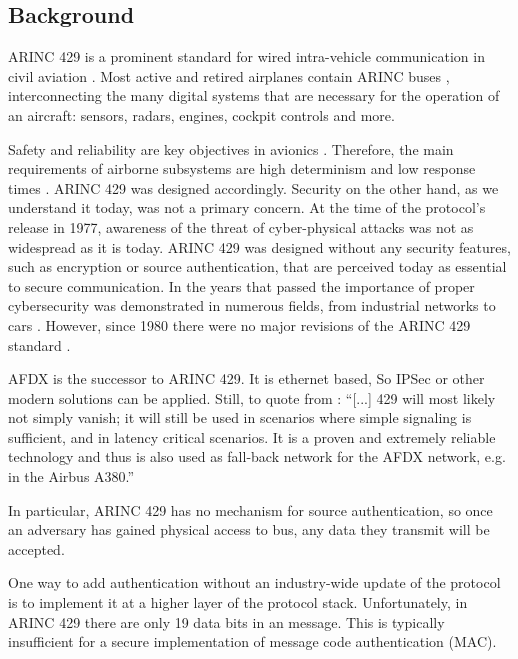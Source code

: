 \documentclass[conference]{IEEEtran}
\begin{document}
\subsection{Background}
  
  ARINC 429 is a prominent standard for wired intra-vehicle communication in civil aviation \cite{arinc2004arinc429}. Most active and retired airplanes contain ARINC buses \cite{fuchs2012evolution}, interconnecting the many digital systems that are necessary for the operation of an aircraft: sensors, radars, engines, cockpit controls and more.
  
  Safety and reliability are key objectives in avionics \cite{fuchs2012evolution}. Therefore, the main requirements of airborne subsystems are high determinism and low response times \cite{thanthry2005aviation}. ARINC 429 was designed accordingly. Security on the other hand, as we understand it today, was not a primary concern. At the time of the protocol's release in 1977, awareness of the threat of cyber-physical attacks was not as widespread as it is today. ARINC 429 was designed without any security features, such as encryption or source authentication, that are perceived today as essential to secure communication. In the years that passed the importance of proper cybersecurity was demonstrated in numerous fields, from industrial networks \cite{langner2011stuxnet} to cars \cite{miller2015remote}. However, since 1980 there were no major revisions of the ARINC 429 standard \cite{18937420070101}.
  
  AFDX is the successor to ARINC 429. It is ethernet based, So IPSec or other modern solutions can be applied. Still, to quote from \cite{fuchs2012evolution}: ``[...] 429 will most likely not simply vanish; it will still be used in scenarios where simple signaling is sufficient, and in latency critical scenarios. It is a proven and extremely reliable technology and thus is also used as fall-back network for the AFDX network, e.g. in the Airbus A380.''
  
  In particular, ARINC 429 has no mechanism for source authentication, so once an adversary has gained physical access to bus, any data they transmit will be accepted.
   
  One way to add authentication without an industry-wide update of the protocol is to implement it at a higher layer of the protocol stack. Unfortunately, in ARINC 429 there are only 19 data bits in an message. This is typically insufficient for a secure implementation of message code authentication (MAC).
  
\end{document}
